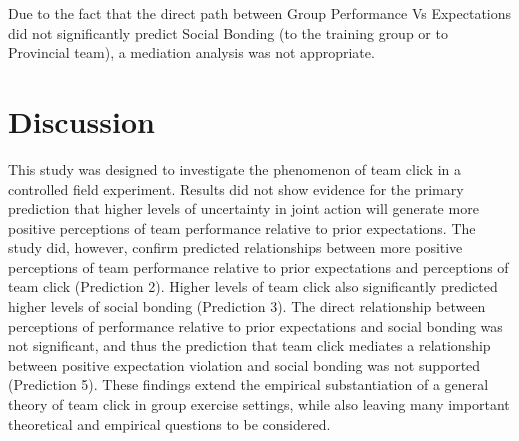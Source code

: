 Due to the fact that the direct path between Group Performance Vs Expectations did not significantly predict Social Bonding (to the training group or to Provincial team), a mediation analysis was not appropriate.




































\clearpage
\section{Discussion}
This study was designed to investigate the phenomenon of team click in a controlled field experiment. Results did not show evidence for the primary prediction that higher levels of uncertainty in joint action will generate more positive perceptions of team performance relative to prior expectations.  The study did, however, confirm predicted relationships between more positive perceptions of team performance relative to prior expectations and perceptions of team click (Prediction 2).  Higher levels of team click also significantly predicted higher levels of social bonding (Prediction 3).  The direct relationship between perceptions of performance relative to prior expectations and social bonding was not significant, and thus the prediction that team click mediates a relationship between positive expectation violation and social bonding was not supported (Prediction 5). These findings extend the empirical substantiation of a general theory of team click in group exercise settings, while also leaving many important theoretical and empirical questions to be considered.


